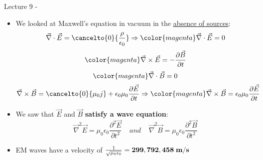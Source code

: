 
\renewcommand{\summarizedlecture}{9 }

%
%
%

\begin{frame}{Lecture \summarizedlecture - \lecturesummarytitle}

\begin{itemize}

\item
We looked at Maxwell's equation in vacuum in the \underline{absence of sources}:
\begin{equation*}
  \vec{\nabla} \cdot \vec{E} = \cancelto{0}{\frac{\rho}{\epsilon_0}} \Rightarrow
  {\color{magenta} \vec{\nabla} \cdot \vec{E} = 0 }
\end{equation*}
\begin{equation*}
   {\color{magenta} \vec{\nabla} \times \vec{E} = - \frac{\partial \vec{B}}{\partial t} }
\end{equation*}
\begin{equation*}
   {\color{magenta} \vec{\nabla} \cdot \vec{B} = 0 }
\end{equation*}
\begin{equation*}
  \vec{\nabla} \times \vec{B} = \cancelto{0}{\mu_0 j} + \epsilon_0 \mu_0 \frac{\partial \vec{E}}{\partial t} \Rightarrow
   {\color{magenta} \vec{\nabla} \times \vec{B} = \epsilon_0 \mu_0 \frac{\partial \vec{E}}{\partial t} }
\end{equation*}

\item
We saw that $\vec{E}$ and $\vec{B}$ {\bf satisfy a wave equation}:
\begin{equation*}
  \vec{\nabla}^{2} \vec{E} = \mu_0 \epsilon_0 \frac{\partial^{2} \vec{E}}{\partial t^{2}}
  \;\;\;\; and \;\;\;\;
  \vec{\nabla}^{2} \vec{B} = \mu_0 \epsilon_0 \frac{\partial^{2} \vec{B}}{\partial t^{2}}
\end{equation*}

\item
EM waves have a velocity of
$\frac{1}{\sqrt{\mu_0 \epsilon_0}} = {\bf 299,792,458 \; m/s}$

\end{itemize}

\end{frame}

%
%
%

